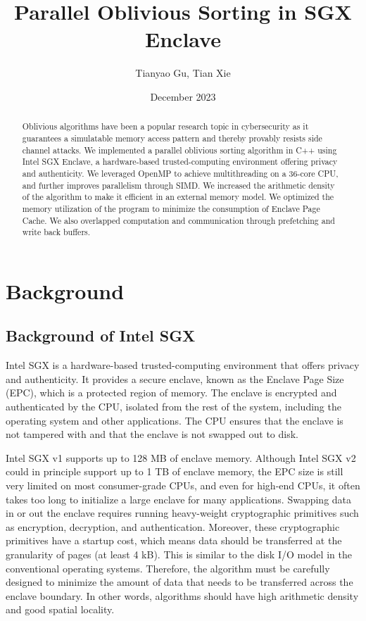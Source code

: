 \documentclass{article}
\title{Parallel Oblivious Sorting in SGX Enclave}
\author{Tianyao Gu, Tian Xie}
\date{December 2023}
\begin{document}
\maketitle

\begin{abstract}
    Oblivious algorithms have been a popular research topic in cybersecurity as it guarantees a simulatable memory access pattern and thereby provably resists side channel attacks. We implemented a parallel oblivious sorting algorithm in C++ using Intel SGX Enclave, a hardware-based trusted-computing environment offering privacy and authenticity. We leveraged OpenMP to achieve multithreading on a 36-core CPU, and further improves parallelism through SIMD. We increased the arithmetic density of the algorithm to make it efficient in an external memory model. We optimized the memory utilization of the program to minimize the consumption of Enclave Page Cache. We also overlapped computation and communication through prefetching and write back buffers.
\end{abstract}

\section{Background}
\subsection{Background of Intel SGX}
Intel SGX is a hardware-based trusted-computing environment that offers privacy and authenticity. It provides a secure enclave, known as the Enclave Page Size (EPC), which is a protected region of memory. The enclave is encrypted and authenticated by the CPU, isolated from the rest of the system, including the operating system and other applications. The CPU ensures that the enclave is not tampered with and that the enclave is not swapped out to disk. 

Intel SGX v1 supports up to 128 MB of enclave memory. Although Intel SGX v2 could in principle support up to 1 TB of enclave memory, the EPC size is still very limited on most consumer-grade CPUs, and even for high-end CPUs, it often takes too long to initialize a large enclave for many applications. Swapping data in or out the enclave requires running heavy-weight cryptographic primitives such as encryption, decryption, and authentication. Moreover, these cryptographic primitives have a startup cost, which means data should be transferred at the granularity of pages (at least 4 kB). This is similar to the disk I/O model in the conventional operating systems. Therefore, the algorithm must be carefully designed to minimize the amount of data that needs to be transferred across the enclave boundary. In other words, algorithms should have high arithmetic density and good spatial locality.
\end{document}
